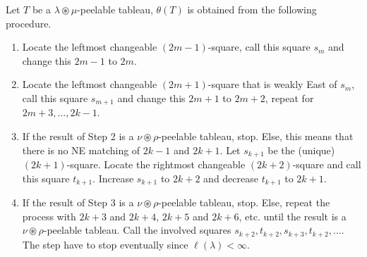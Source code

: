 \documentclass[ALCO,Unicode]{cedram}
\begin{document}
    \begin{defi}\label{def:theta}
        Let $T$ be a $\lambda\circledast\mu$-peelable tableau, $\theta(T)$ is obtained from the following procedure.

        \begin{enumerate}
            \item Locate the leftmost changeable $(2m-1)$-square, call this square $s_m$ and change this $2m-1$ to $2m$.
            \item Locate the leftmost changeable $(2m+1)$-square that is weakly East of $s_m$, call this square $s_{m+1}$ and change this $2m+1$ to $2m+2$, repeat for $2m+3,\ldots,2k-1$.
            \item If the result of Step 2 is a $\nu\circledast\rho$-peelable tableau, stop. Else, this means that there is no NE matching of $2k-1$ and $2k+1$. Let $s_{k+1}$ be the (unique) $(2k+1)$-square. Locate the rightmost changeable $(2k+2)$-square and call this square $t_{k+1}$. Increase $s_{k+1}$ to $2k+2$ and decrease $t_{k+1}$ to $2k+1$.
            \item If the result of Step 3 is a $\nu\circledast\rho$-peelable tableau, stop. Else, repeat the process with $2k+3$ and $2k+4$, $2k+5$ and $2k+6$, etc. until the result is a $\nu\circledast\rho$-peelable tableau. Call the involved squares $s_{k+2},t_{k+2},s_{k+3},t_{k+2},\ldots$. The step have to stop eventually since $\ell(\lambda) < \infty$.
        \end{enumerate}
    \end{defi}
\end{document}
